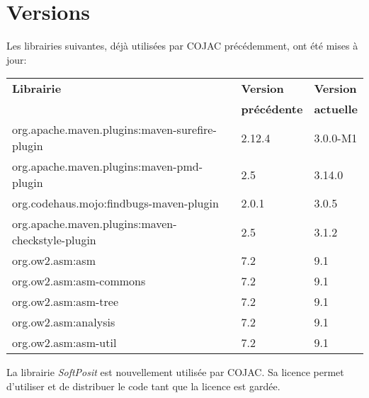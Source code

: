 \chapter{Versions}

Les librairies suivantes, déjà utilisées par COJAC précédemment, ont été mises à jour:

\begin{table}[h]
    \begin{tabularx}{\columnwidth}{ | p{23em} | X | X |}
        \hline
        \textbf{Librairie} & \textbf{Version} & \textbf{Version} \\
         & \textbf{précédente} & \textbf{actuelle} \\
        \hline
        org.apache.maven.plugins:maven-surefire-plugin & 2.12.4 & 3.0.0-M1 \\
        org.apache.maven.plugins:maven-pmd-plugin & 2.5 & 3.14.0 \\
        org.codehaus.mojo:findbugs-maven-plugin & 2.0.1 & 3.0.5 \\
        org.apache.maven.plugins:maven-checkstyle-plugin & 2.5 & 3.1.2 \\
        org.ow2.asm:asm & 7.2 & 9.1 \\
        org.ow2.asm:asm-commons & 7.2 & 9.1 \\
        org.ow2.asm:asm-tree & 7.2 & 9.1 \\
        org.ow2.asm:analysis & 7.2 & 9.1 \\
        org.ow2.asm:asm-util & 7.2 & 9.1 \\
        \hline
    \end{tabularx}
\end{table}

La librairie \textit{SoftPosit} \cite{softposit-gitlab} est nouvellement utilisée par COJAC. Sa licence permet d'utiliser et de distribuer le code tant que la licence est gardée.